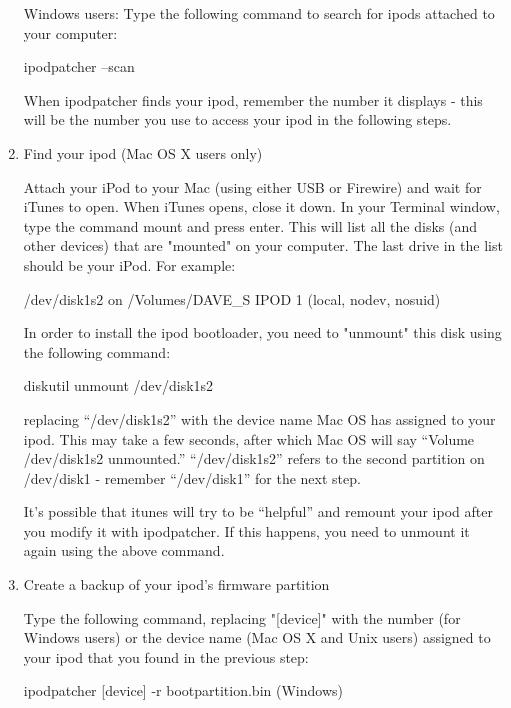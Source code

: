 \begin{enumerate}
    Windows users:  Type the following command to search for ipods attached to 
    your computer: 
      \begin{code} 
        ipodpatcher --scan 
      \end{code}
    
    When ipodpatcher finds your ipod, remember the number it displays - this 
    will  be the number you use to access your ipod in the following steps.


  \item Find your ipod (Mac OS X users only)

    Attach your iPod to your Mac (using either USB or Firewire) and wait for 
    iTunes to open. When iTunes opens, close it down.  In your Terminal window, 
    type the command mount and press enter. This will list all the disks (and 
    other devices) that are "mounted" on your computer. The last  drive in the 
    list should be your iPod. For example: 
    \begin{code}
       /dev/disk1s2 on /Volumes/DAVE_S IPOD 1 (local, nodev, nosuid) 
    \end{code}

    In order to install the ipod bootloader, you need to "unmount" this disk 
    using   the following command: 
      \begin{code} 
        diskutil unmount /dev/disk1s2 
      \end{code}
      
    replacing ``/dev/disk1s2'' with the device name Mac OS has assigned to your
    ipod. This may take a few seconds, after which Mac OS will say ``Volume 
    /dev/disk1s2 unmounted.'' ``/dev/disk1s2'' refers to the second partition on 
    /dev/disk1 - remember   ``/dev/disk1'' for the next step.

    It's possible that itunes will try to be ``helpful'' and remount your ipod 
    after you modify it with ipodpatcher. If this happens, you need to unmount 
    it again using the above command. 
  
  \item Create a backup of your ipod's firmware partition

    Type the following command, replacing "[device]" with the number (for 
    Windows users) or the device name (Mac OS X and Unix users) assigned to 
    your ipod that  you found in the previous step: 
      \begin{code} 
        ipodpatcher [device] -r bootpartition.bin (Windows) 
      \end{code}


\end{enumerate}
